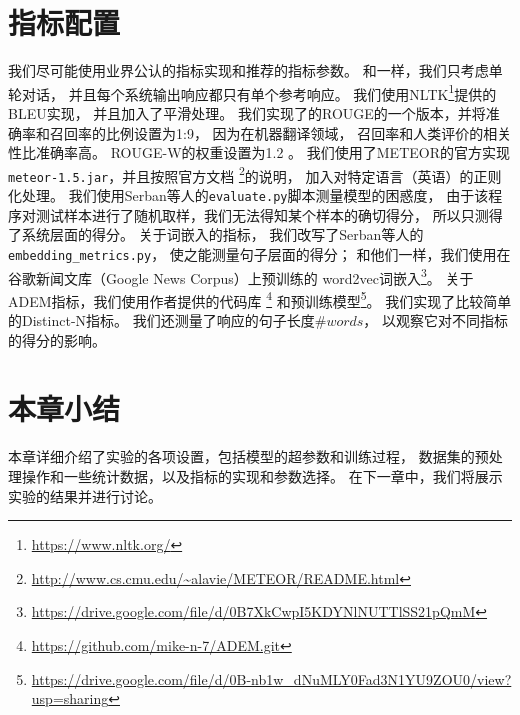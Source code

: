 \section{指标配置}\label{sec:metric_config}
我们尽可能使用业界公认的指标实现和推荐的指标参数。
和\cite{HowNot}一样，我们只考虑单轮对话，
并且每个系统输出响应都只有单个参考响应。
我们使用NLTK\footnote{\url{https://www.nltk.org/}}提供的BLEU实现，
并且加入了平滑处理。
我们实现了的ROUGE的一个版本，并将准确率和召回率的比例设置为1:9，
因为在机器翻译领域，
召回率和人类评价的相关性比准确率高。
ROUGE-W的权重设置为1.2 。
我们使用了METEOR的官方实现\texttt{meteor-1.5.jar}，并且按照官方文档
\footnote{\url{http://www.cs.cmu.edu/~alavie/METEOR/README.html}}的说明，
加入对特定语言（英语）的正则化处理。
我们使用Serban等人的\texttt{evaluate.py}脚本测量模型的困惑度，
由于该程序对测试样本进行了随机取样，我们无法得知某个样本的确切得分，
所以只测得了系统层面的得分。
关于词嵌入的指标，
我们改写了Serban等人的\texttt{embedding\_metrics.py}，
使之能测量句子层面的得分；
和他们一样，我们使用在谷歌新闻文库（Google News Corpus）上预训练的
word2vec词嵌入\footnote{\url{https://drive.google.com/file/d/0B7XkCwpI5KDYNlNUTTlSS21pQmM}}。
关于ADEM指标，我们使用作者提供的代码库
\footnote{\url{https://github.com/mike-n-7/ADEM.git}}
和预训练模型\footnote{\url{https://drive.google.com/file/d/0B-nb1w_dNuMLY0Fad3N1YU9ZOU0/view?usp=sharing}}。
我们实现了比较简单的Distinct-N指标。
我们还测量了响应的句子长度$\textit{\#words}$，
以观察它对不同指标的得分的影响。

\section{本章小结}\label{sec:method_conclusion}
本章详细介绍了实验的各项设置，包括模型的超参数和训练过程，
数据集的预处理操作和一些统计数据，以及指标的实现和参数选择。
在下一章中，我们将展示实验的结果并进行讨论。
